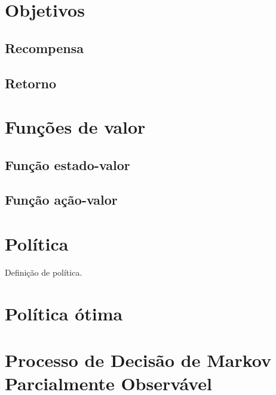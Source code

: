 \documentclass{article}
\begin{document}
\section{Objetivos}

    \subsection{Recompensa}
    
    \subsection{Retorno}
    
\section{Funções de valor}

    \subsection{Função estado-valor}
    
    \subsection{Função ação-valor}

\section{Política}

    Definição de política.

    \section{Política ótima}
    
\section{Processo de Decisão de Markov Parcialmente Observável}
\end{document}
